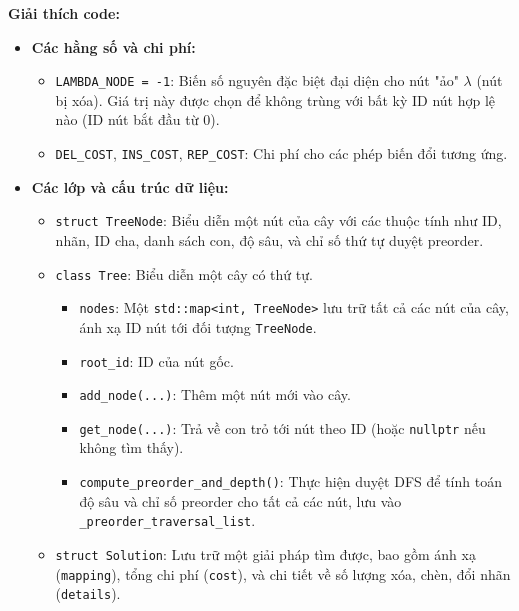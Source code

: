 \documentclass{article}
\begin{document}
\textbf{Giải thích code:}

\begin{itemize}
    \item \textbf{Các hằng số và chi phí:}
    \begin{itemize}
        \item \texttt{LAMBDA\_NODE = -1}: Biến số nguyên đặc biệt đại diện cho nút "ảo" $\lambda$ (nút bị xóa). Giá trị này được chọn để không trùng với bất kỳ ID nút hợp lệ nào (ID nút bắt đầu từ 0).
        \item \texttt{DEL\_COST}, \texttt{INS\_COST}, \texttt{REP\_COST}: Chi phí cho các phép biến đổi tương ứng.
    \end{itemize}

    \item \textbf{Các lớp và cấu trúc dữ liệu:}
    \begin{itemize}
        \item \texttt{struct TreeNode}: Biểu diễn một nút của cây với các thuộc tính như ID, nhãn, ID cha, danh sách con, độ sâu, và chỉ số thứ tự duyệt preorder.
        \item \texttt{class Tree}: Biểu diễn một cây có thứ tự.
            \begin{itemize}
                \item \texttt{nodes}: Một \texttt{std::map<int, TreeNode>} lưu trữ tất cả các nút của cây, ánh xạ ID nút tới đối tượng \texttt{TreeNode}.
                \item \texttt{root\_id}: ID của nút gốc.
                \item \texttt{add\_node(...)}: Thêm một nút mới vào cây.
                \item \texttt{get\_node(...)}: Trả về con trỏ tới nút theo ID (hoặc \texttt{nullptr} nếu không tìm thấy).
                \item \texttt{compute\_preorder\_and\_depth()}: Thực hiện duyệt DFS để tính toán độ sâu và chỉ số preorder cho tất cả các nút, lưu vào \texttt{\_preorder\_traversal\_list}.
            \end{itemize}
        \item \texttt{struct Solution}: Lưu trữ một giải pháp tìm được, bao gồm ánh xạ (\texttt{mapping}), tổng chi phí (\texttt{cost}), và chi tiết về số lượng xóa, chèn, đổi nhãn (\texttt{details}).
    \end{itemize}


\end{itemize}
\end{document}
